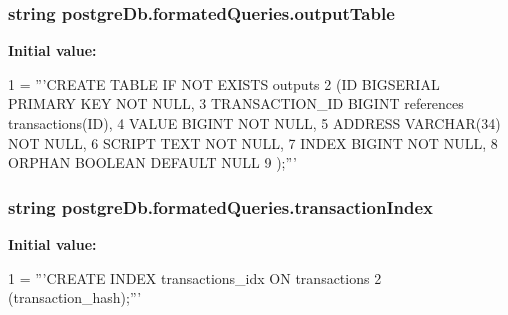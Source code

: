\subsubsection[{output\+Table}]{\setlength{\rightskip}{0pt plus 5cm}string postgre\+Db.\+formated\+Queries.\+output\+Table}\label{namespacepostgreDb_1_1formatedQueries_a0ac81b3d8d15f83d54d82e9f831e805c}
{\bfseries Initial value\+:}
\begin{DoxyCode}
1 = \textcolor{stringliteral}{'''CREATE TABLE IF NOT EXISTS outputs}
2 \textcolor{stringliteral}{                (ID                 BIGSERIAL PRIMARY KEY   NOT NULL,}
3 \textcolor{stringliteral}{                TRANSACTION\_ID      BIGINT              references transactions(ID),}
4 \textcolor{stringliteral}{                VALUE               BIGINT              NOT NULL,}
5 \textcolor{stringliteral}{                ADDRESS             VARCHAR(34)         NOT NULL,}
6 \textcolor{stringliteral}{                SCRIPT              TEXT                NOT NULL,}
7 \textcolor{stringliteral}{                INDEX               BIGINT              NOT NULL,}
8 \textcolor{stringliteral}{                ORPHAN              BOOLEAN             DEFAULT NULL}
9 \textcolor{stringliteral}{                );'''}
\end{DoxyCode}
\hypertarget{namespacepostgreDb_1_1formatedQueries_a450e6088bcb9f0311b29593a30561c9e}{}
\subsubsection[{transaction\+Index}]{\setlength{\rightskip}{0pt plus 5cm}string postgre\+Db.\+formated\+Queries.\+transaction\+Index}\label{namespacepostgreDb_1_1formatedQueries_a450e6088bcb9f0311b29593a30561c9e}
{\bfseries Initial value\+:}
\begin{DoxyCode}
1 = \textcolor{stringliteral}{'''CREATE INDEX transactions\_idx ON transactions}
2 \textcolor{stringliteral}{                    (transaction\_hash);'''}
\end{DoxyCode}
\hypertarget{namespacepostgreDb_1_1formatedQueries_a347aa8c6b951a1569e8bd73dd7756890}{}
